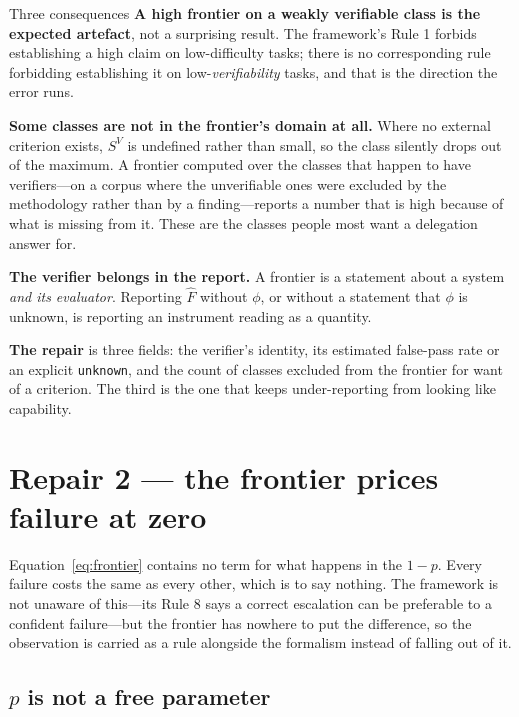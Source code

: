 \documentclass[11pt]{article}
\theoremstyle{definition}
\begin{document}
\begin{cautionbox}{Three consequences}
\textbf{A high frontier on a weakly verifiable class is the expected artefact}, not a surprising result. The framework's Rule 1 forbids establishing a high claim on low-difficulty tasks; there is no corresponding rule forbidding establishing it on low-\emph{verifiability} tasks, and that is the direction the error runs.

\textbf{Some classes are not in the frontier's domain at all.} Where no external criterion exists, $S^V$ is undefined rather than small, so the class silently drops out of the maximum. A frontier computed over the classes that happen to have verifiers---on a corpus where the unverifiable ones were excluded by the methodology rather than by a finding---reports a number that is high because of what is missing from it. These are the classes people most want a delegation answer for.

\textbf{The verifier belongs in the report.} A frontier is a statement about a system \emph{and its evaluator}. Reporting $\hat{F}$ without $\phi$, or without a statement that $\phi$ is unknown, is reporting an instrument reading as a quantity.
\end{cautionbox}

\textbf{The repair} is three fields: the verifier's identity, its estimated false-pass rate or an explicit \texttt{unknown}, and the count of classes excluded from the frontier for want of a criterion. The third is the one that keeps under-reporting from looking like capability.

\section{Repair 2 --- the frontier prices failure at zero}\label{sec:price}

Equation~\eqref{eq:frontier} contains no term for what happens in the $1-p$. Every failure costs the same as every other, which is to say nothing. The framework is not unaware of this---its Rule 8 says a correct escalation can be preferable to a confident failure---but the frontier has nowhere to put the difference, so the observation is carried as a rule alongside the formalism instead of falling out of it.

\subsection{\texorpdfstring{$p$}{p} is not a free parameter}\label{sec:pstar}
\end{document}
